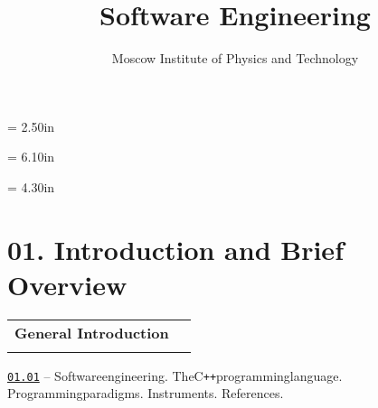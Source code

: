 \documentclass[a4paper,12pt]{article}
\renewenvironment{itemize}
{
    \begin{list}{\labelitemi}
    {
      \setlength{\topsep}{0pt}
      \setlength{\partopsep}{0pt}
      \setlength{\parskip}{0pt}
      \setlength{\itemsep}{0pt}
      \setlength{\parsep}{0pt}
      \setlength{\leftmargin}{14.5pt}
    }
}{\end{list}}
\begin{document}
\newpage\thispagestyle{empty}\pdfpageheight = 2.50in\enlargethispage{100in}

\title{\bf Software Engineering} 

\author{Moscow Institute of Physics and Technology}

\date{}

\maketitle



\newpage\thispagestyle{empty}\pdfpageheight = 6.10in\enlargethispage{100in}

\renewcommand\contentsname{\Large Table of Contents}

\renewcommand{\cftdotsep}{0.5}

\renewcommand{\cftsecleader}{\cftdotfill{\cftdotsep}}

\makeatletter
\let\latexl@section\l@section
\def\l@section#1#2{\begingroup\let\numberline\@gobble\latexl@section{#1}{#2}\endgroup}
\makeatother

\titlelabel{}

\thispagestyle{empty}\tableofcontents\thispagestyle{empty}



\newpage\thispagestyle{empty}\pdfpageheight = 4.30in\enlargethispage{100in}

\section{01. Introduction and Brief Overview}

\begin{tabular}{!{\vrule width 1pt}L{4.1cm}!{\vrule width 1pt}L{14.9cm}!{\vrule width 0pt}} 


\textbf{General Introduction} & \\


\end{tabular}

\medskip\smallskip

\begin{itemize}
    
    \item \href{https://github.com/i-s-m-mipt/Education/blob/master/projects/examples/source/01.01.pdf}{\texttt{01.01}} -- Software\:engineering. The\:C\texttt{++}\:programming\:language. Programming\:paradigms. Instruments. References.
    
\end{itemize}
\end{document}
